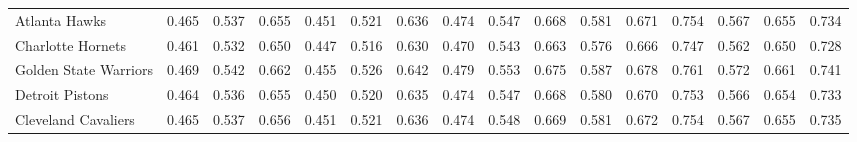 \documentclass[11pt,a4paper]{article}
\begin{document}
\begin{table}[H]
\begin{tabular}{l ccc ccc ccc ccc ccc}
Atlanta Hawks & 0.465 & 0.537 & 0.655 & 0.451 & 0.521 & 0.636 & 0.474 & 0.547 & 0.668 & 0.581 & 0.671 & 0.754 & 0.567 & 0.655 & 0.734 \\
Charlotte Hornets & 0.461 & 0.532 & 0.650 & 0.447 & 0.516 & 0.630 & 0.470 & 0.543 & 0.663 & 0.576 & 0.666 & 0.747 & 0.562 & 0.650 & 0.728 \\
Golden State Warriors & 0.469 & 0.542 & 0.662 & 0.455 & 0.526 & 0.642 & 0.479 & 0.553 & 0.675 & 0.587 & 0.678 & 0.761 & 0.572 & 0.661 & 0.741 \\
Detroit Pistons & 0.464 & 0.536 & 0.655 & 0.450 & 0.520 & 0.635 & 0.474 & 0.547 & 0.668 & 0.580 & 0.670 & 0.753 & 0.566 & 0.654 & 0.733 \\
Cleveland Cavaliers & 0.465 & 0.537 & 0.656 & 0.451 & 0.521 & 0.636 & 0.474 & 0.548 & 0.669 & 0.581 & 0.672 & 0.754 & 0.567 & 0.655 & 0.735 \\
\bottomrule
\end{tabular}
\end{table}
\end{document}
